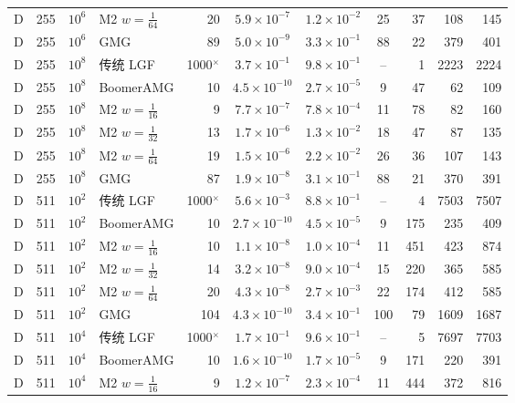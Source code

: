 \begin{longtable}{lrrlrcccrrr}
D & 255 & $10^{6}$ & M2 $w{=}\frac1{64}$ & 20 & $5.9{\times}10^{-7}$ & $1.2{\times}10^{-2}$ & 25 & 37 & 108 & 145 \\
D & 255 & $10^{6}$ & GMG & 89 & $5.0{\times}10^{-9}$ & $3.3{\times}10^{-1}$ & 88 & 22 & 379 & 401 \\
D & 255 & $10^{8}$ & 传统 LGF & 1000$^\times$ & $3.7{\times}10^{-1}$ & $9.8{\times}10^{-1}$ & -- & 1 & 2223 & 2224 \\
D & 255 & $10^{8}$ & BoomerAMG & 10 & $4.5{\times}10^{-10}$ & $2.7{\times}10^{-5}$ & 9 & 47 & 62 & 109 \\
D & 255 & $10^{8}$ & M2 $w{=}\frac1{16}$ & 9 & $7.7{\times}10^{-7}$ & $7.8{\times}10^{-4}$ & 11 & 78 & 82 & 160 \\
D & 255 & $10^{8}$ & M2 $w{=}\frac1{32}$ & 13 & $1.7{\times}10^{-6}$ & $1.3{\times}10^{-2}$ & 18 & 47 & 87 & 135 \\
D & 255 & $10^{8}$ & M2 $w{=}\frac1{64}$ & 19 & $1.5{\times}10^{-6}$ & $2.2{\times}10^{-2}$ & 26 & 36 & 107 & 143 \\
D & 255 & $10^{8}$ & GMG & 87 & $1.9{\times}10^{-8}$ & $3.1{\times}10^{-1}$ & 88 & 21 & 370 & 391 \\
D & 511 & $10^{2}$ & 传统 LGF & 1000$^\times$ & $5.6{\times}10^{-3}$ & $8.8{\times}10^{-1}$ & -- & 4 & 7503 & 7507 \\
D & 511 & $10^{2}$ & BoomerAMG & 10 & $2.7{\times}10^{-10}$ & $4.5{\times}10^{-5}$ & 9 & 175 & 235 & 409 \\
D & 511 & $10^{2}$ & M2 $w{=}\frac1{16}$ & 10 & $1.1{\times}10^{-8}$ & $1.0{\times}10^{-4}$ & 11 & 451 & 423 & 874 \\
D & 511 & $10^{2}$ & M2 $w{=}\frac1{32}$ & 14 & $3.2{\times}10^{-8}$ & $9.0{\times}10^{-4}$ & 15 & 220 & 365 & 585 \\
D & 511 & $10^{2}$ & M2 $w{=}\frac1{64}$ & 20 & $4.3{\times}10^{-8}$ & $2.7{\times}10^{-3}$ & 22 & 174 & 412 & 585 \\
D & 511 & $10^{2}$ & GMG & 104 & $4.3{\times}10^{-10}$ & $3.4{\times}10^{-1}$ & 100 & 79 & 1609 & 1687 \\
D & 511 & $10^{4}$ & 传统 LGF & 1000$^\times$ & $1.7{\times}10^{-1}$ & $9.6{\times}10^{-1}$ & -- & 5 & 7697 & 7703 \\
D & 511 & $10^{4}$ & BoomerAMG & 10 & $1.6{\times}10^{-10}$ & $1.7{\times}10^{-5}$ & 9 & 171 & 220 & 391 \\
D & 511 & $10^{4}$ & M2 $w{=}\frac1{16}$ & 9 & $1.2{\times}10^{-7}$ & $2.3{\times}10^{-4}$ & 11 & 444 & 372 & 816 \\

\end{longtable}
